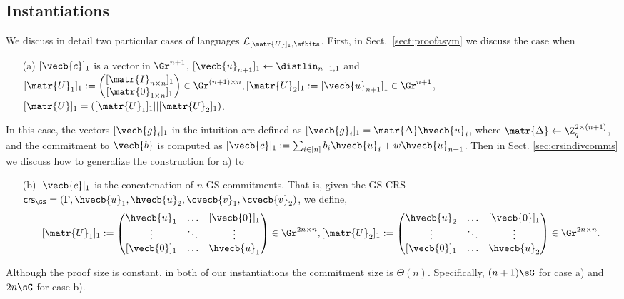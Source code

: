 \subsection{Instantiations} \label{subsec:instantiations}
We discuss in detail two particular cases of languages $\mathcal{\mathcal{L}}_{[\matr{U}]_1,\sfbits}$. First, in Sect.~\ref{sect:proofasym} we discuss the case when 
\begin{itemize}
\item[(a)] $[\vecb{c}]_1$ is a vector in $\Gr^{n+1}$,  $[\vecb{u}_{n+1}]_1 \leftarrow \distlin_{n+1,1}$ and
 $[\matr{U}_1]_1:=\begin{pmatrix}{[\matr{I}_{n\times n}]_1}\\{[\matr{0}_{1\times n}]_1}\end{pmatrix} \in \Gr^{(n+1) \times n}, [\matr{U}_2]_1:=[\vecb{u}_{n+1}]_1 \in \Gr^{n+1}$, $[\matr{U}]_1=([\matr{U}_1]_1|| [\matr{U}_2]_1)$.    
\end{itemize}
In this case, the vectors $[\vecb{g}_i]_1$ in the intuition are defined as $[\vecb{g}_i]_1=\matr{\Delta} \hvecb{u}_i$, where $\matr{\Delta}\gets\Z_q^{2\times(n+1)}$, and the commitment 
to $\vecb{b}$ is computed as $[\vecb{c}]_1:=\sum_{i\in[n]}b_i\hvecb{u}_i+w\hvecb{u}_{n+1}$.
Then in Sect. \ref{sec:crsindivcomms} we discuss how to generalize the construction for a) to 
\begin{itemize}
 \item[(b)] $[\vecb{c}]_1$ is the concatenation of $n$ GS commitments. That is, given the  GS CRS   $\mathsf{crs}_\GS=(\Gamma,\hvecb{u}_1,\hvecb{u}_2,\cvecb{v}_1,\cvecb{v}_2)$, we define,
$$[\matr{U}_1]_1:=  \begin{pmatrix} \hvecb{u}_1 & \ldots & [\vecb{0}]_1\\ \vdots & \ddots & \vdots \\   [\vecb{0}]_1 & \ldots & \hvecb{u}_1  \end{pmatrix} \in \Gr^{2n \times n},  [\matr{U}_2]_1:= \begin{pmatrix} \hvecb{u}_2 & \ldots & [\vecb{0}]_1\\ \vdots & \ddots & \vdots \\  [\vecb{0}]_1 & \ldots & \hvecb{u}_2  \end{pmatrix} \in \Gr^{2n \times n}.$$ 
\end{itemize}

Although the proof size is constant, in both of our instantiations the commitment size is $\Theta(n)$. Specifically, $(n+1)\sG$ for case a) and $2n\sG$ for case b).



